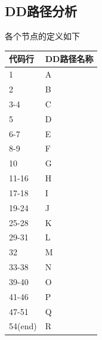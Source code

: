 \documentclass[12pt, a4paper, oneside]{ctexart}
\begin{document}
\subsection{DD路径分析}

各个节点的定义如下
    \begin{table}[!h]
        \begin{tabular}{|l|l|}
        \hline
    代码行 & DD路径名称 \\ \hline
    1 & A \\ \hline
    2 & B \\ \hline
    3-4 & C \\ \hline
    5 & D \\ \hline
    6-7 & E \\ \hline
    8-9 & F \\ \hline
    10 & G \\ \hline
    11-16 & H \\ \hline
    17-18 & I \\ \hline
    19-24 & J \\ \hline
    25-28 & K \\ \hline
    29-31 & L \\ \hline
    32 & M \\ \hline
    33-38 & N \\ \hline
    39-40 & O \\ \hline
    41-46 & P \\ \hline
    47-51 & Q \\ \hline
    54(end) & R \\ \hline
\end{tabular}
    \end{table}
\end{document}
